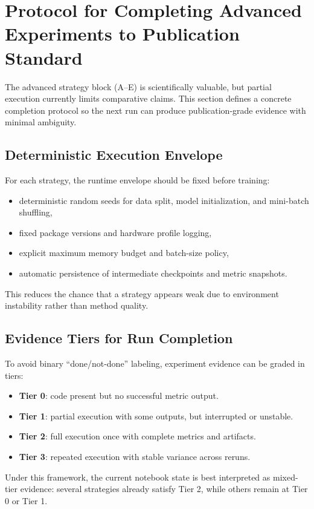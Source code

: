 \documentclass[10pt,journal]{IEEEtran}
\begin{document}
\section{Protocol for Completing Advanced Experiments to Publication Standard}
The advanced strategy block (A--E) is scientifically valuable, but partial execution currently limits comparative claims. This section defines a concrete completion protocol so the next run can produce publication-grade evidence with minimal ambiguity.

\subsection{Deterministic Execution Envelope}
For each strategy, the runtime envelope should be fixed before training:
\begin{itemize}
\item deterministic random seeds for data split, model initialization, and mini-batch shuffling,
\item fixed package versions and hardware profile logging,
\item explicit maximum memory budget and batch-size policy,
\item automatic persistence of intermediate checkpoints and metric snapshots.
\end{itemize}

This reduces the chance that a strategy appears weak due to environment instability rather than method quality.

\subsection{Evidence Tiers for Run Completion}
To avoid binary ``done/not-done'' labeling, experiment evidence can be graded in tiers:
\begin{itemize}
\item \textbf{Tier 0}: code present but no successful metric output.
\item \textbf{Tier 1}: partial execution with some outputs, but interrupted or unstable.
\item \textbf{Tier 2}: full execution once with complete metrics and artifacts.
\item \textbf{Tier 3}: repeated execution with stable variance across reruns.
\end{itemize}

Under this framework, the current notebook state is best interpreted as mixed-tier evidence: several strategies already satisfy Tier 2, while others remain at Tier 0 or Tier 1.
\end{document}
